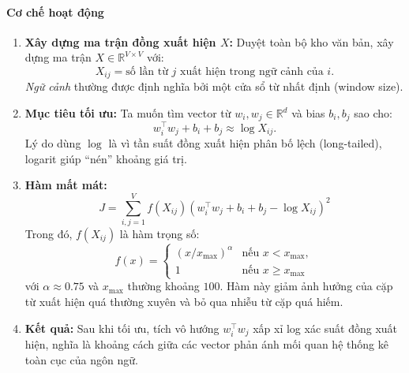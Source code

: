 \paragraph{Cơ chế hoạt động}
\begin{enumerate}
    \item \textbf{Xây dựng ma trận đồng xuất hiện $X$:} 
    Duyệt toàn bộ kho văn bản, xây dựng ma trận $X \in \mathbb{R}^{V \times V}$ với:
    \[
    X_{ij} = \text{số lần từ $j$ xuất hiện trong ngữ cảnh của $i$}.
    \]
    \textit{Ngữ cảnh} thường được định nghĩa bởi một cửa sổ từ nhất định (window size).

    \item \textbf{Mục tiêu tối ưu:} 
    Ta muốn tìm vector từ $w_i, w_j \in \mathbb{R}^d$ và bias $b_i, b_j$ sao cho:
    \[
    w_i^\top w_j + b_i + b_j \approx \log X_{ij}.
    \]
    Lý do dùng $\log$ là vì tần suất đồng xuất hiện phân bố lệch (long-tailed), logarit giúp “nén” khoảng giá trị.

    \item \textbf{Hàm mất mát:}
    \begin{equation}
        J = \sum_{i,j=1}^{V} f(X_{ij}) \left( w_i^\top w_j + b_i + b_j - \log X_{ij} \right)^2
        \label{eq:glove_loss}
    \end{equation}
    Trong đó, $f(X_{ij})$ là hàm trọng số:
    \[
    f(x) = \begin{cases}
        (x/x_{\max})^\alpha & \text{nếu } x < x_{\max},\\
        1 & \text{nếu } x \ge x_{\max}
    \end{cases}
    \]
    với $\alpha \approx 0.75$ và $x_{\max}$ thường khoảng $100$. 
    Hàm này giảm ảnh hưởng của cặp từ xuất hiện quá thường xuyên và bỏ qua nhiễu từ cặp quá hiếm.

    \item \textbf{Kết quả:} 
    Sau khi tối ưu, tích vô hướng $w_i^\top w_j$ xấp xỉ log xác suất đồng xuất hiện, nghĩa là khoảng cách giữa các vector phản ánh mối quan hệ thống kê toàn cục của ngôn ngữ.
\end{enumerate}


